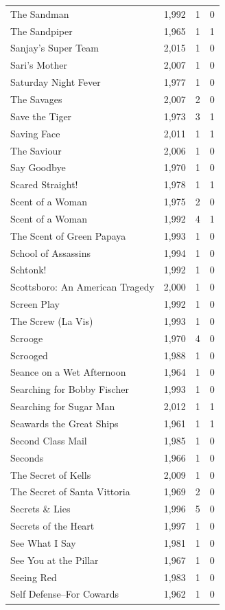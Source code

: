 \begin{tabular}{lrrr}
The Sandman & 1,992 & 1 & 0 \\
The Sandpiper & 1,965 & 1 & 1 \\
Sanjay's Super Team & 2,015 & 1 & 0 \\
Sari's Mother & 2,007 & 1 & 0 \\
Saturday Night Fever & 1,977 & 1 & 0 \\
The Savages & 2,007 & 2 & 0 \\
Save the Tiger & 1,973 & 3 & 1 \\
Saving Face & 2,011 & 1 & 1 \\
The Saviour & 2,006 & 1 & 0 \\
Say Goodbye & 1,970 & 1 & 0 \\
Scared Straight! & 1,978 & 1 & 1 \\
Scent of a Woman & 1,975 & 2 & 0 \\
Scent of a Woman & 1,992 & 4 & 1 \\
The Scent of Green Papaya & 1,993 & 1 & 0 \\
School of Assassins & 1,994 & 1 & 0 \\
Schtonk! & 1,992 & 1 & 0 \\
Scottsboro: An American Tragedy & 2,000 & 1 & 0 \\
Screen Play & 1,992 & 1 & 0 \\
The Screw (La Vis) & 1,993 & 1 & 0 \\
Scrooge & 1,970 & 4 & 0 \\
Scrooged & 1,988 & 1 & 0 \\
Seance on a Wet Afternoon & 1,964 & 1 & 0 \\
Searching for Bobby Fischer & 1,993 & 1 & 0 \\
Searching for Sugar Man & 2,012 & 1 & 1 \\
Seawards the Great Ships & 1,961 & 1 & 1 \\
Second Class Mail & 1,985 & 1 & 0 \\
Seconds & 1,966 & 1 & 0 \\
The Secret of Kells & 2,009 & 1 & 0 \\
The Secret of Santa Vittoria & 1,969 & 2 & 0 \\
Secrets \& Lies & 1,996 & 5 & 0 \\
Secrets of the Heart & 1,997 & 1 & 0 \\
See What I Say & 1,981 & 1 & 0 \\
See You at the Pillar & 1,967 & 1 & 0 \\
Seeing Red & 1,983 & 1 & 0 \\
Self Defense--For Cowards & 1,962 & 1 & 0 \\

\end{tabular}
